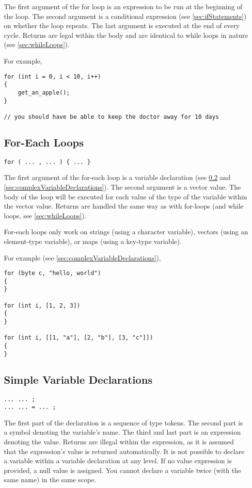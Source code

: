 \documentclass[10pt,a4paper]{article}
\begin{document}
The first argument of the for loop is an expression to be run at the beginning of the loop. The second argument is a conditional expression (see \ref{sec:ifStatements}) on whether the loop repeats. The last argument is executed at the end of every cycle. Returns are legal within the body and are identical to while loops in nature (see \ref{sec:whileLoops}).

For example,
\begin{verbatim}
for (int i = 0, i < 10, i++)
{
    get_an_apple();
}

// you should have be able to keep the doctor away for 10 days
\end{verbatim}

\subsection{For-Each Loops}
\begin{verbatim}
for ( ... , ... ) { ... }
\end{verbatim}

The first argument of the for-each loop is a variable declaration (see \ref{sec:simpleVariableDeclarations} and \ref{sec:complexVariableDeclarations}). The second argument is a vector value. The body of the loop will be executed for each value of the type of the variable within the vector value. Returns are handled the same way as with for-loops (and while loops, see \ref{sec:whileLoops}).

For-each loops only work on strings (using a character variable), vectors (using an element-type variable), or maps (using a key-type variable).

For example (see \ref{sec:complexVariableDeclarations}),
\begin{verbatim}
for (byte c, "hello, world")
{
}

for (int i, [1, 2, 3])
{
}

for (int i, [[1, "a"], [2, "b"], [3, "c"]])
{
}
\end{verbatim}

\subsection{Simple Variable Declarations}
\label{sec:simpleVariableDeclarations}
\begin{verbatim}
... ... ;
... ... = ... ;
\end{verbatim}

The first part of the declaration is a sequence of type tokens. The second part is a symbol denoting the variable's name. The third and last part is an expression denoting the value. Returns are illegal within the expression, as it is assumed that the expression's value is returned automatically. It is not possible to declare a variable within a variable declaration at any level. If no value expression is provided, a null value is assigned. You cannot declare a variable twice (with the same name) in the same scope.
\end{document}
